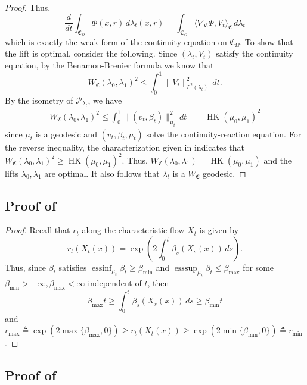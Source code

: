 \documentclass[11pt]{article}
\DeclareMathOperator{\esssup}{esssup}
\newcommand{\HK}{\operatorname{HK}}
\begin{document}
\begin{proof}
    Thus,
    \[\frac{d}{dt}\int_{\mathfrak{C}_\Omega}\Phi(x,r) \, d\lambda_t(x,r) = \int_{\mathfrak{C}_\Omega}\langle \nabla_{\mathfrak{C}}\Phi, V_t\rangle_{\mathfrak{C}} \, d\lambda_t\]
    which is exactly the weak form of the continuity equation on $\mathfrak{C}_\Omega$. To show that the lift is optimal, consider the following. Since $(\lambda_t, V_t)$ satisfy the continuity equation, by the Benamou-Brenier formula we know that 
    \[W_\mathfrak{C}(\lambda_0, \lambda_1)^2 \leq \int_0^1\|V_t\|_{L^2(\lambda_t)}^2 \, dt.\]
    By the isometry of $\mathcal{P}_{\lambda_t}$, we have
    \begin{align*}
        W_{\mathfrak{C}}(\lambda_0, \lambda_1)^2 \leq \int_0^1 \|(v_t, \beta_t)\|_{\mu_t}^2 \, dt &= \HK(\mu_0, \mu_1)^2
    \end{align*}
    since $\mu_t$ is a geodesic and $(v_t, \beta_t, \mu_t)$ solve the continuity-reaction equation. For the reverse inequality, the characterization given in  indicates that $W_\mathfrak{C}(\lambda_0, \lambda_1)^2 \geq \HK(\mu_0, \mu_1)^2$. Thus, $W_\mathfrak{C}(\lambda_0, \lambda_1) = \HK(\mu_0, \mu_1)$ and the lifts $\lambda_0, \lambda_1$ are optimal. It also follows that $\lambda_t$ is a $W_\mathfrak{C}$ geodesic.
\end{proof}

\subsection{Proof of } \label{sec: proof of uniformly bounded lifts}

\begin{proof}
    Recall that $r_t$ along the characteristic flow $X_t$ is given by
    \[r_t(X_t(x)) = \exp\left(2\int_0^t \beta_s(X_s(x))\, ds\right).\]
    Thus, since $\beta_t$ satisfies
    $\operatorname{essinf}_{\mu_t} \beta_t \geq \beta_{\min}$ and $\esssup_{\mu_t}\beta_t \leq \beta_{\max}$
    for some $\beta_{\min} > -\infty, \beta_{\max} < \infty$ independent of $t$, then 
    \[  \beta_{\max}t\geq \int_0^t\beta_s(X_s(x)) \, ds \geq \beta_{\min}t\]
    and $r_{\max}\triangleq \exp(2\max\{\beta_{\max}, 0\})\geq r_t(X_t(x)) \geq \exp\left(2 \min\{\beta_{\min}, 0\}\right) \triangleq r_{\min}$.
\end{proof}

\subsection{Proof of } \label{sec: proof of uniformly regular lifts}
\end{document}
